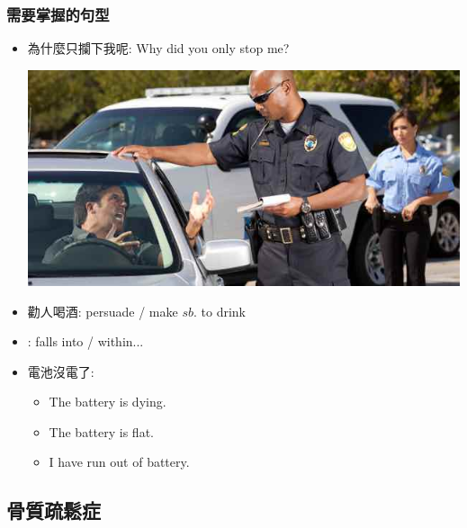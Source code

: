 \subsubsection*{需要掌握的句型}
\begin{multicols}{2}
\begin{itemize}
  \itemsep0em
  \item 為什麼只攔下我呢: Why did you only stop me?
  \begin{center}
  	\includegraphics[scale=.4]{pics/stop-me}
  \end{center}
  \item 勸人喝酒: persuade / make $sb.$ to drink
  \item {}: falls into / within...
  \item 電池沒電了:
  \begin{itemize}
  \itemsep0em
  	\item The battery is dying.
  	\item The battery is flat.
  	\item I have run out of battery.
  \end{itemize}
\end{itemize}
\end{multicols}

\subsection{骨質疏鬆症}
